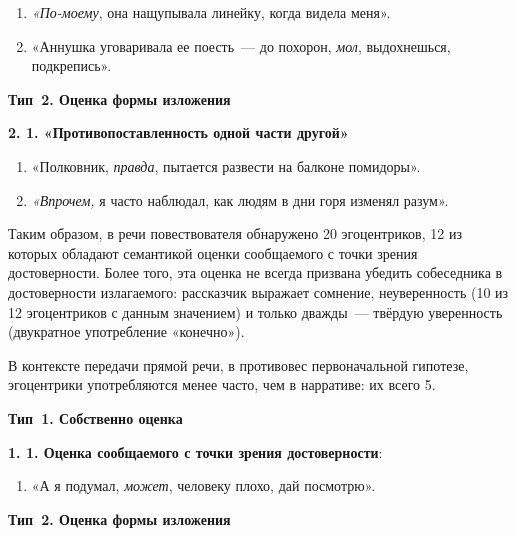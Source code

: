 \documentclass{kursa4}
\begin{document}
    \setcounter{saveenum}{\value{enumi}}
    \begin{enumerate}
    \setcounter{enumi}{\value{saveenum}}
    \item \textit{«По-моему}, она нащупывала линейку, когда видела меня».
    \item «Аннушка уговаривала ее поесть~--- до похорон, \textit{мол},
    выдохнешься, подкрепись».
    \end{enumerate}
    {\centering
    \textbf{Тип~2. Оценка формы изложения }
    \par}

    \textbf{2. 1. «Противопоставленность одной части другой»}

    \setcounter{saveenum}{\value{enumi}}
    \begin{enumerate}
    \setcounter{enumi}{\value{saveenum}}
    \item «Полковник, \textit{правда}, пытается развести на балконе
    помидоры».
    \item \textit{«Впрочем,} я часто наблюдал, как людям в дни горя изменял
    разум».
    \end{enumerate}

    \bigskip

    Таким образом, в речи повествователя обнаружено 20 эгоцентриков, 12
    из которых обладают семантикой оценки сообщаемого с точки зрения
    достоверности. Более того, эта оценка не всегда призвана убедить
    собеседника в достоверности излагаемого: рассказчик выражает сомнение,
    неуверенность (10 из 12 эгоцентриков с данным значением) и только
    дважды~--- твёрдую уверенность (двукратное употребление «конечно»). 

    В контексте передачи прямой речи, в противовес первоначальной
    гипотезе, эгоцентрики употребляются менее часто, чем в нарративе: их
    всего 5. 

    {\centering
    \textbf{{Тип~1. Собственно оценка}}
    \par}

    \textbf{{1. 1. О}}\textbf{ценка сообщаемого с точки
    зрения достоверности}:

    \begin{enumerate}
    \item «А я подумал, \textit{может}, человеку плохо, дай посмотрю».
    \end{enumerate}

    \bigskip

    {\centering
    \textbf{Тип~2. Оценка формы изложения }
    \par}
\end{document}
